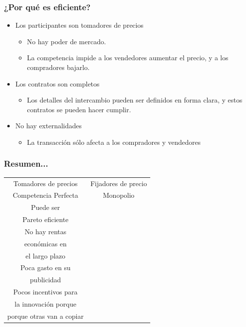 \documentclass{beamer}
\begin{document}
\begin{frame}
\frametitle{¿Por qué es eficiente?}
\begin{itemize}
    \item Los participantes son tomadores de precios\vspace{2mm}
    \begin{itemize}
        \item No hay poder de mercado.\vspace{1mm}
        \item La competencia impide a los vendedores aumentar el precio, y a los compradores bajarlo.\vspace{2mm}
    \end{itemize}
    \item Los contratos son completos\vspace{2mm}
        \begin{itemize}
        \item Los detalles del intercambio pueden ser definidos en forma clara, y estos contratos se pueden hacer cumplir.\vspace{2mm}
        \end{itemize}
    \item No hay externalidades\vspace{2mm}
        \begin{itemize}
        \item La transacción sólo afecta a los compradores y vendedores
        \end{itemize}
\end{itemize}
\end{frame}

\begin{frame}
\frametitle{Resumen...}
\small
\begin{center}
    \begin{tabular}{c|c}
    \hline
    \hline
    Tomadores de precios & Fijadores de precio \\
    Competencia Perfecta & Monopolio
    \\
    \hline
    \hline
    Puede ser   &  \\ 
    Pareto eficiente & 
    \\
    \hline
    No hay rentas &  \\
    económicas en &  \\
    el largo plazo & 
    \\
    \hline
    Poca gasto en su &  \\ publicidad & 
    \\
    \hline
    Pocos incentivos para &   \\ 
    la innovación porque &  \\
    porque otras van a copiar & 
\end{tabular}
\end{center}
\end{frame}
\end{document}
